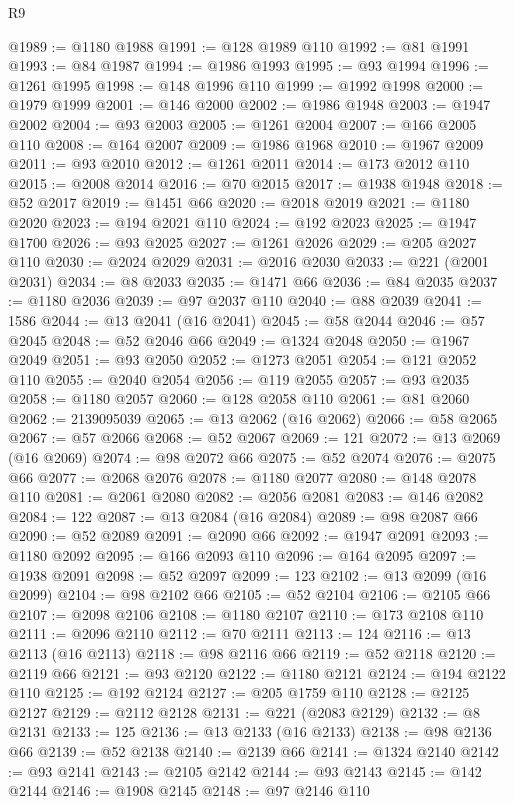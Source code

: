 \begin{lexlean}{R9}
\begin{coremodule}
@1989 := @1180 @1988
@1991 := @128 @1989 @110
@1992 := @81 @1991
@1993 := @84 @1987
@1994 := @1986 @1993
@1995 := @93 @1994
@1996 := @1261 @1995
@1998 := @148 @1996 @110
@1999 := @1992 @1998
@2000 := @1979 @1999
@2001 := @146 @2000
@2002 := @1986 @1948
@2003 := @1947 @2002
@2004 := @93 @2003
@2005 := @1261 @2004
@2007 := @166 @2005 @110
@2008 := @164 @2007
@2009 := @1986 @1968
@2010 := @1967 @2009
@2011 := @93 @2010
@2012 := @1261 @2011
@2014 := @173 @2012 @110
@2015 := @2008 @2014
@2016 := @70 @2015
@2017 := @1938 @1948
@2018 := @52 @2017
@2019 := @1451 @66
@2020 := @2018 @2019
@2021 := @1180 @2020
@2023 := @194 @2021 @110
@2024 := @192 @2023
@2025 := @1947 @1700
@2026 := @93 @2025
@2027 := @1261 @2026
@2029 := @205 @2027 @110
@2030 := @2024 @2029
@2031 := @2016 @2030
@2033 := @221 (@2001 @2031)
@2034 := @8 @2033
@2035 := @1471 @66
@2036 := @84 @2035
@2037 := @1180 @2036
@2039 := @97 @2037 @110
@2040 := @88 @2039
@2041 := 1586
@2044 := @13 @2041 (@16 @2041)
@2045 := @58 @2044
@2046 := @57 @2045
@2048 := @52 @2046 @66
@2049 := @1324 @2048
@2050 := @1967 @2049
@2051 := @93 @2050
@2052 := @1273 @2051
@2054 := @121 @2052 @110
@2055 := @2040 @2054
@2056 := @119 @2055
@2057 := @93 @2035
@2058 := @1180 @2057
@2060 := @128 @2058 @110
@2061 := @81 @2060
@2062 := 2139095039
@2065 := @13 @2062 (@16 @2062)
@2066 := @58 @2065
@2067 := @57 @2066
@2068 := @52 @2067
@2069 := 121
@2072 := @13 @2069 (@16 @2069)
@2074 := @98 @2072 @66
@2075 := @52 @2074
@2076 := @2075 @66
@2077 := @2068 @2076
@2078 := @1180 @2077
@2080 := @148 @2078 @110
@2081 := @2061 @2080
@2082 := @2056 @2081
@2083 := @146 @2082
@2084 := 122
@2087 := @13 @2084 (@16 @2084)
@2089 := @98 @2087 @66
@2090 := @52 @2089
@2091 := @2090 @66
@2092 := @1947 @2091
@2093 := @1180 @2092
@2095 := @166 @2093 @110
@2096 := @164 @2095
@2097 := @1938 @2091
@2098 := @52 @2097
@2099 := 123
@2102 := @13 @2099 (@16 @2099)
@2104 := @98 @2102 @66
@2105 := @52 @2104
@2106 := @2105 @66
@2107 := @2098 @2106
@2108 := @1180 @2107
@2110 := @173 @2108 @110
@2111 := @2096 @2110
@2112 := @70 @2111
@2113 := 124
@2116 := @13 @2113 (@16 @2113)
@2118 := @98 @2116 @66
@2119 := @52 @2118
@2120 := @2119 @66
@2121 := @93 @2120
@2122 := @1180 @2121
@2124 := @194 @2122 @110
@2125 := @192 @2124
@2127 := @205 @1759 @110
@2128 := @2125 @2127
@2129 := @2112 @2128
@2131 := @221 (@2083 @2129)
@2132 := @8 @2131
@2133 := 125
@2136 := @13 @2133 (@16 @2133)
@2138 := @98 @2136 @66
@2139 := @52 @2138
@2140 := @2139 @66
@2141 := @1324 @2140
@2142 := @93 @2141
@2143 := @2105 @2142
@2144 := @93 @2143
@2145 := @142 @2144
@2146 := @1908 @2145
@2148 := @97 @2146 @110

\end{coremodule}
\end{lexlean}

